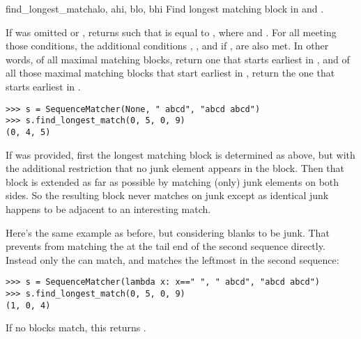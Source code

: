 \begin{methoddesc}{find_longest_match}{alo, ahi, blo, bhi}
  Find longest matching block in 
  and .

  If  was omitted or ,
   returns  such that  is equal
  to , where
       and
      .
  For all  meeting those
  conditions, the additional conditions
      ,
      ,
      and if , 
  are also met.
  In other words, of all maximal matching blocks, return one that
  starts earliest in , and of all those maximal matching blocks
  that start earliest in , return the one that starts earliest
  in .

\begin{verbatim}
>>> s = SequenceMatcher(None, " abcd", "abcd abcd")
>>> s.find_longest_match(0, 5, 0, 9)
(0, 4, 5)
\end{verbatim}

  If  was provided, first the longest matching block is
  determined as above, but with the additional restriction that no
  junk element appears in the block.  Then that block is extended as
  far as possible by matching (only) junk elements on both sides.
  So the resulting block never matches on junk except as identical
  junk happens to be adjacent to an interesting match.

  Here's the same example as before, but considering blanks to be junk.
  That prevents  from matching the  at the
  tail end of the second sequence directly.  Instead only the
   can match, and matches the leftmost  in
  the second sequence:

\begin{verbatim}
>>> s = SequenceMatcher(lambda x: x==" ", " abcd", "abcd abcd")
>>> s.find_longest_match(0, 5, 0, 9)
(1, 0, 4)
\end{verbatim}

  If no blocks match, this returns .
\end{methoddesc}

